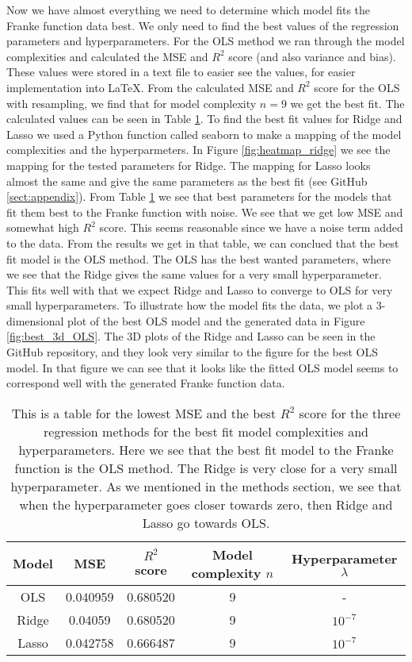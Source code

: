 \documentclass[12pt,a4paper,english]{article}
\begin{document}
Now we have almost everything we need to determine which model fits the Franke function data best. We only need to find the best values of the regression parameters and hyperparameters. For the OLS method we ran through the model complexities and calculated the MSE and $R^2$ score (and also variance and bias). These values were stored in a text file to easier see the values, for easier implementation into LaTeX. From the calculated MSE and $R^2$ score for the OLS with resampling, we find that for model complexity $n=9$ we get the best fit. The calculated values can be seen in Table \ref{tab:best_val}. To find the best fit values for Ridge and Lasso we used a Python function called seaborn to make a mapping of the model complexities and the hyperparmeters. In Figure \ref{fig:heatmap_ridge} we see the mapping for the tested parameters for Ridge. The mapping for Lasso looks almost the same and give the same parameters as the best fit (see GitHub \ref{sect:appendix}). From Table \ref{tab:best_val} we see that best parameters for the models that fit them best to the Franke function with noise. We see that we get low MSE and somewhat high $R^2$ score. This seems reasonable since we have a noise term added to the data. From the results we get in that table, we can conclued that the best fit model is the OLS method. The OLS has the best wanted parameters, where we see that the Ridge gives the same values for a very small hyperparameter. This fits well with that we expect Ridge and Lasso to converge to OLS for very small hyperparameters. To illustrate how the model fits the data, we plot a 3-dimensional plot of the best OLS model and the generated data in Figure \ref{fig:best_3d_OLS}. The 3D plots of the Ridge and Lasso can be seen in the GitHub repository, and they look very similar to the figure for the best OLS model. In that figure we can see that it looks like the fitted OLS model seems to correspond well with the generated Franke function data.

\begin{table}[h!]
	\centering
	\begin{tabular}{ |c|c|c|c|c| }
		\hline \rule{0pt}{13pt}
		Model& MSE & $R^2$ score & Model complexity $n$& Hyperparameter $\lambda$\\
		\hline \rule{0pt}{13pt}
		OLS & 0.040959 & 0.680520 & 9 & - \\
		\hline \rule{0pt}{13pt}
		Ridge & 0.04059 & 0.680520 & 9 & $10^{-7}$ \\
		\hline \rule{0pt}{13pt}
		Lasso & 0.042758 & 0.666487 & 9 & $10^{-7}$ \\
		\hline
	\end{tabular}	
	\caption{This is a table for the lowest MSE and the best $R^2$ score for the three regression methods for the best fit model complexities and hyperparameters. Here we see that the best fit model to the Franke function is the OLS method. The Ridge is very close for a very small hyperparameter. As we mentioned in the methods section, we see that when the hyperparameter goes closer towards zero, then Ridge and Lasso go towards OLS.}
	\label{tab:best_val}
\end{table}
\end{document}
